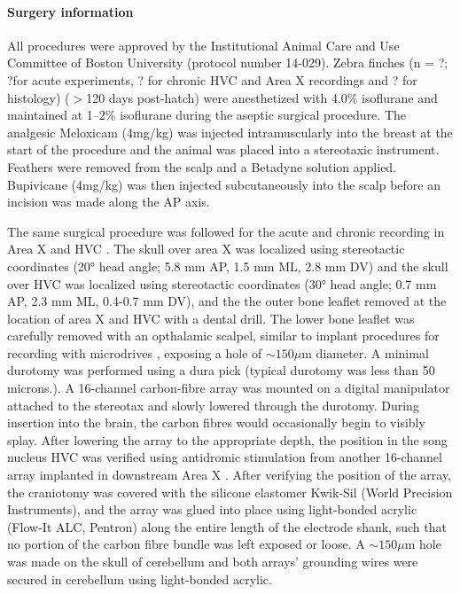 \documentclass[10pt,letterpaper]{article}
\let\oldmarginpar\marginpar
\renewcommand{\marginpar}[1]{\oldmarginpar{\linespread{1}\scriptsize{#1}}}
\renewcommand{\subsubsection}[1]{\paragraph{#1}}
\begin{document}
\subsubsection{Surgery information}

All procedures were approved by the Institutional Animal Care and Use
Committee of Boston University (protocol number 14-029). Zebra finches
\marginpar{Jun?} (n = ?; ?for acute experiments, ? for chronic HVC and Area X
recordings and ? for histology) ($>$120 days post-hatch) were
anesthetized with 4.0\% isoflurane and maintained at 1--2\% isoflurane
during the aseptic surgical procedure. The analgesic Meloxicam
(4mg/kg) was injected intramuscularly into the breast at the start of
the procedure and the animal was placed into a stereotaxic
instrument. Feathers were removed from the scalp and a Betadyne
solution applied. Bupivicane (4mg/kg) was then injected subcutaneously
into the scalp before an incision was made along the AP axis.

The same surgical procedure was followed for the acute and chronic
recording in Area X and HVC \cite{Guitchounts2013electrode}. The skull
over area X was localized using stereotactic coordinates (20° head
angle; 5.8 mm AP, 1.5 mm ML, 2.8 mm DV) and the skull over HVC was
localized using stereotactic coordinates (30° head angle; 0.7 mm AP,
2.3 mm ML, 0.4-0.7 mm DV), and the the outer bone leaflet removed at
the location of area X and HVC with a dental drill. The lower bone
leaflet was carefully removed with an opthalamic scalpel, similar to
implant procedures for recording with microdrives
\cite{Long2010synfire}, exposing a hole of $\sim 150 \mu$m diameter. A
minimal durotomy was performed using a dura pick (typical durotomy was
less than 50 microns.). A 16-channel carbon-fibre array
\cite{Guitchounts2013electrode} was mounted on a digital manipulator
attached to the stereotax and slowly lowered through the
durotomy. During insertion into the brain, the carbon fibres would
occasionally begin to visibly splay. After lowering the array to the
appropriate depth, the position in the song nucleus HVC was verified
using antidromic stimulation from another 16-channel array implanted
in downstream Area X
\cite{Hahnloser2002sparse,Guitchounts2013electrode}.  After verifying
the position of the array, the craniotomy was covered with the
silicone elastomer Kwik-Sil (World Precision Instruments), and the
array was glued into place using light-bonded acrylic (Flow-It ALC,
Pentron) along the entire length of the electrode shank, such that no
portion of the carbon fibre bundle was left exposed or loose. A $\sim
150\mu$m hole was made on the skull of cerebellum and both arrays’
grounding wires were secured in cerebellum using light-bonded acrylic.
\end{document}
